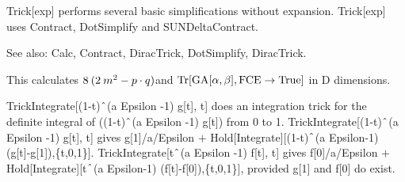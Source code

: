 

Trick[exp] performs several basic simplifications without expansion. Trick[exp] uses Contract, DotSimplify and SUNDeltaContract.

See also:  Calc, Contract, DiracTrick, DotSimplify, DiracTrick.


This calculates \(8\> (2\> {m^2}-p\cdot q)\)and \(\mathrm{Tr}[\mathrm{GA}[\alpha ,\beta ],\mathrm{FCE}\rightarrow \mathrm{True}]\)
in D dimensions.













 TrickIntegrate[(1-t)\(\RawWedge\)(a Epsilon -1) g[t], t] does an integration trick for the definite integral of ((1-t)\(\RawWedge\)(a
  Epsilon -1) g[t]) { }from 0 to 1. TrickIntegrate[(1-t)\(\RawWedge\)(a Epsilon -1) g[t], t] gives { }g[1]/a/Epsilon \(+\)
  Hold[Integrate][(1-t)\(\RawWedge\)(a Epsilon-1) (g[t]-g[1]),\{t,0,1\}]. TrickIntegrate[t\(\RawWedge\)(a Epsilon -1) f[t], t] gives
  f[0]/a/Epsilon \(+\) Hold[Integrate][t\(\RawWedge\)(a Epsilon-1) (f[t]-f[0]),\{t,0,1\}], provided g[1] and f[0] do exist.

